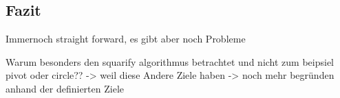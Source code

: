 \subsection{Fazit}
Immernoch straight forward, es gibt aber noch Probleme 

Warum besonders den squarify algorithmus betrachtet und nicht zum beipsiel pivot oder circle?? -> weil diese Andere Ziele haben -> noch mehr begründen anhand der definierten Ziele











